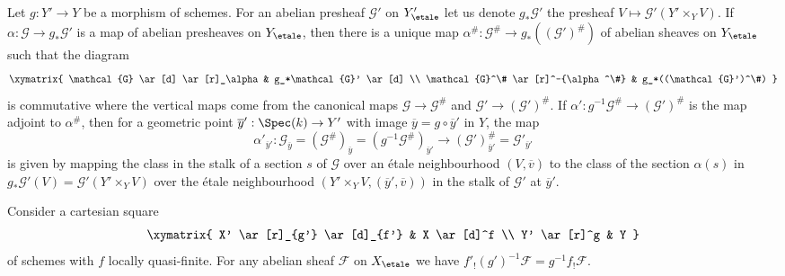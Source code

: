 \begin{remark}
\label{remark-construct-map-presheaves-downstairs}
Let $g : Y' \to Y$ be a morphism of schemes.
For an abelian presheaf $\mathcal{G}'$ on $Y'_\etale$ let us denote
$g_*\mathcal{G}'$ the presheaf $V \mapsto \mathcal{G}'(Y' \times_Y V)$.
If $\alpha : \mathcal{G} \to g_*\mathcal{G}'$ is a map of abelian presheaves
on $Y_\etale$, then there is a unique map
$\alpha^\# : \mathcal{G}^\# \to g_*((\mathcal{G}')^\#)$
of abelian sheaves on $Y_\etale$ such that the diagram
$$
\xymatrix{
\mathcal{G} \ar[d] \ar[r]_\alpha & g_*\mathcal{G}' \ar[d] \\
\mathcal{G}^\# \ar[r]^-{\alpha^\#} & g_*((\mathcal{G}')^\#)
}
$$
is commutative where the vertical maps come from the canonical maps
$\mathcal{G} \to \mathcal{G}^\#$ and $\mathcal{G}' \to (\mathcal{G}')^\#$. If
$\alpha' : g^{-1}\mathcal{G}^\# \to (\mathcal{G}')^\#$
is the map adjoint to $\alpha^\#$, then for a geometric point
$\overline{y}' : \Spec(k) \to Y'$ with image
$\overline{y} = g \circ \overline{y}'$ in $Y$, the map
$$
\alpha'_{\overline{y}'} :
\mathcal{G}_{\overline{y}} =
(\mathcal{G}^\#)_{\overline{y}} =
(g^{-1}\mathcal{G}^\#)_{\overline{y}'}
\longrightarrow
(\mathcal{G}')^\#_{\overline{y}'} =
\mathcal{G}'_{\overline{y}'}
$$
is given by mapping the class in the stalk of a section $s$ of $\mathcal{G}$
over an \'etale neighbourhood $(V, \overline{v})$ to the class of the section
$\alpha(s)$ in $g_*\mathcal{G}'(V) = \mathcal{G}'(Y' \times_Y V)$
over the \'etale neighbourhood $(Y' \times_Y V, (\overline{y}', \overline{v}))$
in the stalk of $\mathcal{G}'$ at $\overline{y}'$.
\end{remark}

\begin{lemma}
\label{lemma-lqf-base-change-f-shriek}
Consider a cartesian square
$$
\xymatrix{
X' \ar[r]_{g'} \ar[d]_{f'} & X \ar[d]^f \\
Y' \ar[r]^g & Y
}
$$
of schemes with $f$ locally quasi-finite. For any abelian sheaf $\mathcal{F}$
on $X_\etale$ we have $f'_!(g')^{-1}\mathcal{F} = g^{-1}f_!\mathcal{F}$.
\end{lemma}

